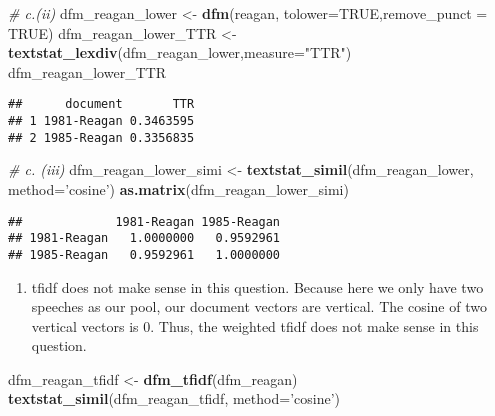 \documentclass[]{article}
\newenvironment{Shaded}{\begin{snugshade}}{\end{snugshade}}
\newcommand{\KeywordTok}[1]{\textcolor[rgb]{0.13,0.29,0.53}{\textbf{#1}}}
\newcommand{\DataTypeTok}[1]{\textcolor[rgb]{0.13,0.29,0.53}{#1}}
\newcommand{\StringTok}[1]{\textcolor[rgb]{0.31,0.60,0.02}{#1}}
\newcommand{\CommentTok}[1]{\textcolor[rgb]{0.56,0.35,0.01}{\textit{#1}}}
\newcommand{\OtherTok}[1]{\textcolor[rgb]{0.56,0.35,0.01}{#1}}
\newcommand{\NormalTok}[1]{#1}
\providecommand{\tightlist}{%
  \setlength{\itemsep}{0pt}\setlength{\parskip}{0pt}}
\begin{document}
\begin{Shaded}
\begin{Highlighting}[]
\CommentTok{# c.(ii)}
\NormalTok{dfm_reagan_lower <-}\StringTok{ }\KeywordTok{dfm}\NormalTok{(reagan, }\DataTypeTok{tolower=}\OtherTok{TRUE}\NormalTok{,}\DataTypeTok{remove_punct =} \OtherTok{TRUE}\NormalTok{)}
\NormalTok{dfm_reagan_lower_TTR <-}\StringTok{ }\KeywordTok{textstat_lexdiv}\NormalTok{(dfm_reagan_lower,}\DataTypeTok{measure=}\StringTok{"TTR"}\NormalTok{)}
\NormalTok{dfm_reagan_lower_TTR}
\end{Highlighting}
\end{Shaded}

\begin{verbatim}
##      document       TTR
## 1 1981-Reagan 0.3463595
## 2 1985-Reagan 0.3356835
\end{verbatim}

\begin{Shaded}
\begin{Highlighting}[]
\CommentTok{# c. (iii)}
\NormalTok{dfm_reagan_lower_simi <-}\StringTok{ }\KeywordTok{textstat_simil}\NormalTok{(dfm_reagan_lower, }\DataTypeTok{method=}\StringTok{'cosine'}\NormalTok{)}
\KeywordTok{as.matrix}\NormalTok{(dfm_reagan_lower_simi)}
\end{Highlighting}
\end{Shaded}

\begin{verbatim}
##             1981-Reagan 1985-Reagan
## 1981-Reagan   1.0000000   0.9592961
## 1985-Reagan   0.9592961   1.0000000
\end{verbatim}

\begin{enumerate}
\def\labelenumi{\alph{enumi}.}
\setcounter{enumi}{3}
\tightlist
\item
  tfidf does not make sense in this question. Because here we only have
  two speeches as our pool, our document vectors are vertical. The
  cosine of two vertical vectors is 0. Thus, the weighted tfidf does not
  make sense in this question.
\end{enumerate}

\begin{Shaded}
\begin{Highlighting}[]
\NormalTok{dfm_reagan_tfidf <-}\StringTok{ }\KeywordTok{dfm_tfidf}\NormalTok{(dfm_reagan)}
\KeywordTok{textstat_simil}\NormalTok{(dfm_reagan_tfidf, }\DataTypeTok{method=}\StringTok{'cosine'}\NormalTok{)}
\end{Highlighting}
\end{Shaded}
\end{document}
